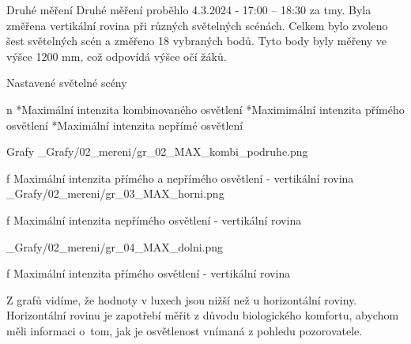\sec Druhé měření
Druhé měření proběhlo 4.3.2024 - 17:00 – 18:30 za tmy. Byla změřena vertikální rovina při různých světelných scénách. Celkem bylo zvoleno šest světelných scén a změřeno 18 vybraných bodů. Tyto body byly měřeny ve výšce 1200 mm, což odpovídá výšce očí žáků.
\medskip

{\sbf Nastavené světelné scény}

\begitems \style n
    *Maximální intenzita kombinovaného osvětlení
    *Maximimální intenzita přímého osvětlení
    *Maximální intenzita nepřímé osvětlení
\enditems

\secc Grafy
\medskip {}
\picw=15cm _Grafy/02_mereni/gr_02_MAX_kombi_podruhe.png
\caption/f Maximální intenzita přímého a nepřímého osvětlení - vertikální rovina
\medskip {}
\picw=15cm _Grafy/02_mereni/gr_03_MAX_horni.png
\caption/f Maximální intenzita nepřímého osvětlení - vertikální rovina

\medskip {}
\picw=15cm _Grafy/02_mereni/gr_04_MAX_dolni.png
\caption/f Maximální intenzita přímého osvětlení - vertikální rovina
\medskip

Z grafů vidíme, že hodnoty v luxech jsou nižší než u horizontální roviny. Horizontální rovinu je zapotřebí měřit z důvodu biologického komfortu, abychom měli informaci o~tom, jak je osvětlenost vnímaná z pohledu pozorovatele.



